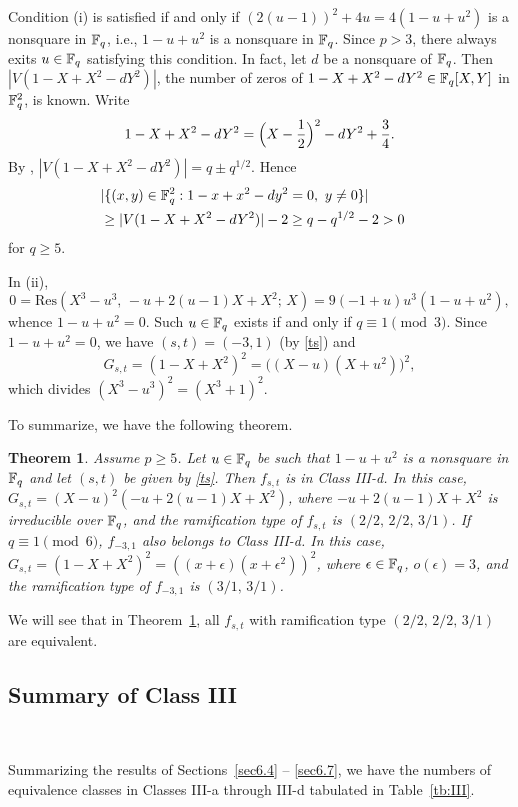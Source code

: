 \documentclass{amsart}
\newtheorem{thm}{Theorem}[section]
\numberwithin{equation}{section}
\theoremstyle{definition}
\newcommand{\f}{\Bbb F}
\begin{document}
Condition (i) is satisfied if and only if $(2(u-1))^2+4u=4(1-u+u^2)$ is a nonsquare in $\f_q$, i.e., $1-u+u^2$ is a nonsquare in $\f_q$. Since $p>3$, there always exits $u\in\f_q$ satisfying this condition. In fact, let $d$ be a nonsquare of $\f_q$. Then $|V(1-X+X^2-dY^2)|$, the number of zeros of $1-X+X^2-dY^2\in\f_q[X,Y]$ in $\f_q^2$, is known. Write
\[
1-X+X^2-dY^2=\Bigl(X-\frac 12\Big)^2-dY^2+\frac 34.
\]
By \cite[Lemma~6.55]{Hou-ams-gsm-2018}, $|V(1-X+X^2-dY^2)|=q\pm q^{1/2}$. Hence
\begin{align*}
&|\{(x,y)\in\f_q^2:1-x+x^2-dy^2=0,\ y\ne 0\}|\cr
&\ge|V(1-X+X^2-dY^2)|-2\ge q-q^{1/2}-2>0
\end{align*}
for $q\ge 5$.

In (ii),
\[
0=\text{Res}(X^3-u^3,\,-u+2(u-1)X+X^2;\,X)=9(-1+u)u^3(1-u+u^2),
\]
whence $1-u+u^2=0$. Such $u\in\f_q$ exists if and only if $q\equiv 1\pmod 3$. Since $1-u+u^2=0$, we have $(s,t)=(-3,1)$ (by \eqref{ts}) and
\[
G_{s,t}=(1-X+X^2)^2=\bigl((X-u)(X+u^2)\bigr)^2,
\]
which divides $(X^3-u^3)^2=(X^3+1)^2$.

\medskip

To summarize, we have the following theorem.

\begin{thm}\label{thm:III-d}
Assume $p\ge 5$. Let $u\in\f_q$ be such that $1-u+u^2$ is a nonsquare in $\f_q$ and let $(s,t)$ be given by \eqref{ts}. Then $f_{s,t}$ is in Class III-d. In this case, $G_{s,t}=(X-u)^2(-u+2(u-1)X+X^2)$, where 
$-u+2(u-1)X+X^2$ is irreducible over $\f_q$, and the ramification type of $f_{s,t}$ is $(2/2,\,2/2,\,3/1)$. If $q\equiv 1\pmod 6$, $f_{-3,1}$ also belongs to Class III-d. In this case, $G_{s,t}=(1-X+X^2)^2=((x+\epsilon)(x+\epsilon^2))^2$, where $\epsilon\in\f_q$, $o(\epsilon)=3$, and the ramification type of $f_{-3,1}$ is $(3/1,\,3/1)$.
\end{thm}

We will see that in Theorem~\ref{thm:III-d}, all $f_{s,t}$ with ramification type $(2/2,\,2/2,\,3/1)$ are equivalent. 


\subsection{Summary of Class III}\label{sec6.8}\ 

Summarizing the results of Sections~\ref{sec6.4} -- \ref{sec6.7}, we have the numbers of equivalence classes in Classes III-a through III-d tabulated in Table~\ref{tb:III}. 
\end{document}
